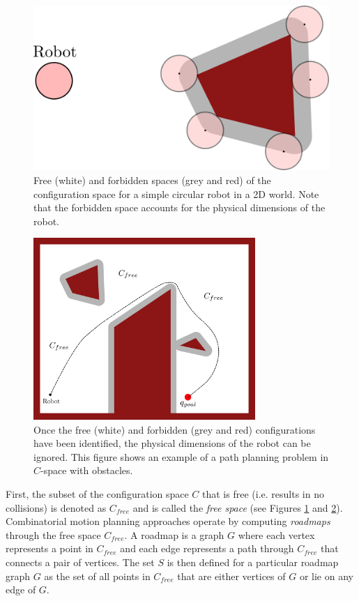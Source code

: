 \begin{figure}[ht]
 \centering
 	\includegraphics[width=.5\textwidth]{tex/figs/ch06_figs/obs_padding.png}
	\caption{Free (white) and forbidden spaces (grey and red) of the configuration space for a simple circular robot in a 2D world. Note that the forbidden space accounts for the physical dimensions of the robot.}
 \label{fig:collision-free-space-fig}
\end{figure}
\begin{figure}[ht]
\begin{center}
\includegraphics[width=0.75\textwidth]{tex/figs/ch06_figs/2d_ws_Cfree.png}
\caption{Once the free (white) and forbidden (grey and red) configurations have been identified, the physical dimensions of the robot can be ignored. This figure shows an example of a path planning problem in $C$-space with obstacles.}
\label{fig:combinatorial-planning}
\end{center}
\end{figure}
First, the subset of the configuration space $C$ that is free (i.e. results in no collisions) is denoted as $C_{free}$ and is called the \textit{free space} (see Figures \ref{fig:collision-free-space-fig} and \ref{fig:combinatorial-planning}).
Combinatorial motion planning approaches operate by computing \textit{roadmaps} through the free space $C_{free}$. A roadmap is a graph $G$ where each vertex represents a point in $C_{free}$ and each edge represents a path through $C_{free}$ that connects a pair of vertices. The set $S$ is then defined for a particular roadmap graph $G$ as the set of all points in $C_{free}$ that are either vertices of $G$ or lie on any edge of $G$.
